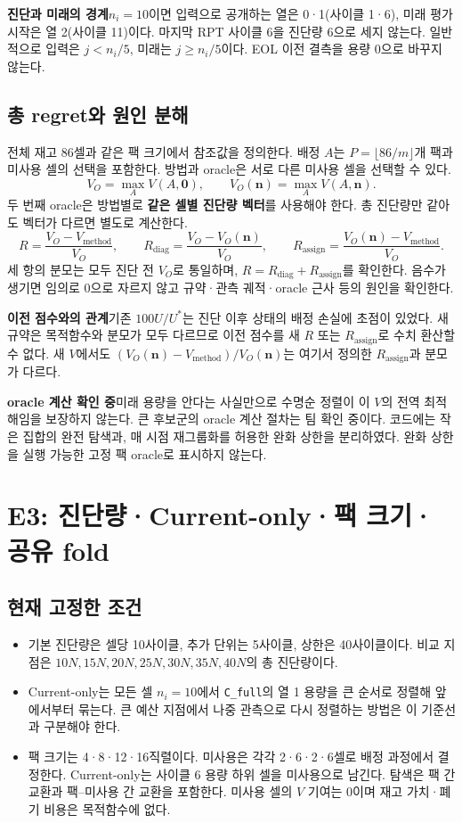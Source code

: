 \documentclass[11pt,a4paper]{article}
\newcommand{\file}[1]{{\small\nolinkurl{#1}}}
\begin{document}
\textbf{진단과 미래의 경계}\quad $n_i=10$이면 입력으로 공개하는 열은 0·1(사이클 1·6), 미래 평가 시작은 열 2(사이클 11)이다. 마지막 RPT 사이클 6을 진단량 6으로 세지 않는다. 일반적으로 입력은 $j<n_i/5$, 미래는 $j\ge n_i/5$이다. EOL 이전 결측을 용량 0으로 바꾸지 않는다.

\subsection*{총 regret와 원인 분해}
전체 재고 86셀과 같은 팩 크기에서 참조값을 정의한다. 배정 $A$는 $P=\lfloor86/m\rfloor$개 팩과 미사용 셀의 선택을 포함한다. 방법과 oracle은 서로 다른 미사용 셀을 선택할 수 있다.
\[
V_O=\max_A V(A,\mathbf 0),\qquad
V_O(\mathbf n)=\max_A V(A,\mathbf n).
\]
두 번째 oracle은 방법별로 \textbf{같은 셀별 진단량 벡터}를 사용해야 한다. 총 진단량만 같아도 벡터가 다르면 별도로 계산한다.
\[
R=\frac{V_O-V_{\mathrm{method}}}{V_O},\qquad
R_{\mathrm{diag}}=\frac{V_O-V_O(\mathbf n)}{V_O},\qquad
R_{\mathrm{assign}}=\frac{V_O(\mathbf n)-V_{\mathrm{method}}}{V_O}.
\]
세 항의 분모는 모두 진단 전 $V_O$로 통일하며, $R=R_{\mathrm{diag}}+R_{\mathrm{assign}}$를 확인한다. 음수가 생기면 임의로 0으로 자르지 않고 규약·관측 궤적·oracle 근사 등의 원인을 확인한다.

\textbf{이전 점수와의 관계}\quad 기존 $100U/U^*$는 진단 이후 상태의 배정 손실에 초점이 있었다. 새 규약은 목적함수와 분모가 모두 다르므로 이전 점수를 새 $R$ 또는 $R_{\mathrm{assign}}$로 수치 환산할 수 없다. 새 $V$에서도 $(V_O(\mathbf n)-V_{\mathrm{method}})/V_O(\mathbf n)$는 여기서 정의한 $R_{\mathrm{assign}}$과 분모가 다르다.

\textbf{oracle 계산 확인 중}\quad 미래 용량을 안다는 사실만으로 수명순 정렬이 이 $V$의 전역 최적해임을 보장하지 않는다. 큰 후보군의 oracle 계산 절차는 팀 확인 중이다. 코드에는 작은 집합의 완전 탐색과, 매 시점 재그룹화를 허용한 완화 상한을 분리하였다. 완화 상한을 실행 가능한 고정 팩 oracle로 표시하지 않는다.

\clearpage
\section{E3: 진단량·Current-only·팩 크기·공유 fold}
\subsection*{현재 고정한 조건}
\begin{itemize}
\item 기본 진단량은 셀당 10사이클, 추가 단위는 5사이클, 상한은 40사이클이다. 비교 지점은 $10N,15N,20N,25N,30N,35N,40N$의 총 진단량이다.
\item Current-only는 모든 셀 $n_i=10$에서 \file{C_full}의 열 1 용량을 큰 순서로 정렬해 앞에서부터 묶는다. 큰 예산 지점에서 나중 관측으로 다시 정렬하는 방법은 이 기준선과 구분해야 한다.
\item 팩 크기는 4·8·12·16직렬이다. 미사용은 각각 2·6·2·6셀로 배정 과정에서 결정한다. Current-only는 사이클 6 용량 하위 셀을 미사용으로 남긴다. 탐색은 팩 간 교환과 팩--미사용 간 교환을 포함한다. 미사용 셀의 $V$ 기여는 0이며 재고 가치·폐기 비용은 목적함수에 없다.
\end{itemize}
\end{document}
